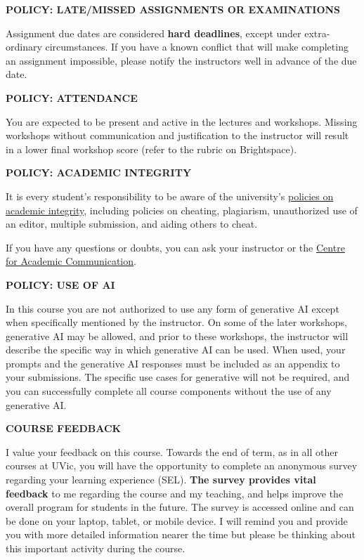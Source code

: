 \documentclass[11pt]{article}
\begin{document}
\textbf{POLICY: LATE/MISSED ASSIGNMENTS OR EXAMINATIONS}

Assignment due dates are considered \textbf{hard deadlines}, except under extra-ordinary circumstances. If you have a known conflict that will make completing an assignment impossible, please notify the instructors well in advance of the due date.

\textbf{POLICY: ATTENDANCE}

You are expected to be present and active in the lectures and workshops. Missing workshops without communication and justification to the instructor will result in a lower final workshop score (refer to the rubric on Brightspace).

\textbf{POLICY: ACADEMIC INTEGRITY}

It is every student's responsibility to be aware of the university's \href{https://web.uvic.ca/calendar/undergrad/info/regulations/academic-integrity.html}{policies on academic integrity}, including policies on cheating, plagiarism, unauthorized use of an editor, multiple submission, and aiding others to cheat.

If you have any questions or doubts, you can ask your instructor or the \href{https://uvic.ca/learningandteaching/cac}{Centre for Academic Communication}.


\textbf{POLICY: USE OF AI}

In this course you are not authorized to use any form of generative AI except when specifically mentioned by the instructor. On some of the later workshops, generative AI may be allowed, and prior to these workshops, the instructor will describe the specific way in which generative AI can be used. When used, your prompts and the generative AI responses must be included as an appendix to your submissions. The specific use cases for generative will not be required, and you can successfully complete all course components without the use of any generative AI.

\begin{center}
	\textbf{COURSE FEEDBACK}
\end{center}
\smallskip
\vspace*{-.6em}
I value your feedback on this course. Towards the end of term, as in all other courses at UVic, you will have the opportunity to complete an anonymous survey regarding your learning experience (SEL). \textbf{The survey provides vital feedback} to me regarding the course and my teaching, and helps improve the overall program for students in the future. The survey is accessed online and can be done on your laptop, tablet, or mobile device. I will remind you and provide you with more detailed information nearer the time but please be thinking about this important activity during the course.
\end{document}
